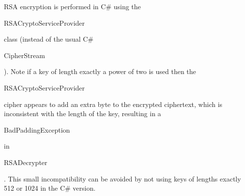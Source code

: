 RSA encryption is performed in C\# using the \begin{code}RSACryptoServiceProvider\end{code}
class (instead of the usual C\# \begin{code}CipherStream\end{code}).
Note if a key of length exactly a power of two is used then the
\begin{code}RSACryptoServiceProvider\end{code} cipher appears to add an
extra byte to the encrypted ciphertext, which is inconsistent
with the length of the key,
resulting in a \begin{code}BadPaddingException\end{code} in \begin{code}RSADecrypter\end{code}.
This small incompatibility can be avoided by not using keys of lengths
exactly 512 or 1024 in the C\# version.
